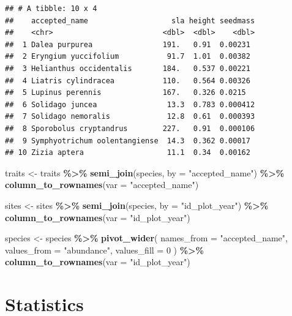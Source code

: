 \documentclass[
]{article}
\newenvironment{Shaded}{\begin{snugshade}}{\end{snugshade}}
\newcommand{\AttributeTok}[1]{\textcolor[rgb]{0.13,0.29,0.53}{#1}}
\newcommand{\DecValTok}[1]{\textcolor[rgb]{0.00,0.00,0.81}{#1}}
\newcommand{\FunctionTok}[1]{\textcolor[rgb]{0.13,0.29,0.53}{\textbf{#1}}}
\newcommand{\NormalTok}[1]{#1}
\newcommand{\OtherTok}[1]{\textcolor[rgb]{0.56,0.35,0.01}{#1}}
\newcommand{\SpecialCharTok}[1]{\textcolor[rgb]{0.81,0.36,0.00}{\textbf{#1}}}
\newcommand{\StringTok}[1]{\textcolor[rgb]{0.31,0.60,0.02}{#1}}
\begin{document}
\begin{verbatim}
## # A tibble: 10 x 4
##    accepted_name                   sla height seedmass
##    <chr>                         <dbl>  <dbl>    <dbl>
##  1 Dalea purpurea                191.   0.91  0.00231 
##  2 Eryngium yuccifolium           91.7  1.01  0.00382 
##  3 Helianthus occidentalis       184.   0.537 0.00221 
##  4 Liatris cylindracea           110.   0.564 0.00326 
##  5 Lupinus perennis              167.   0.326 0.0215  
##  6 Solidago juncea                13.3  0.783 0.000412
##  7 Solidago nemoralis             12.8  0.61  0.000393
##  8 Sporobolus cryptandrus        227.   0.91  0.000106
##  9 Symphyotrichum oolentangiense  14.3  0.362 0.00017 
## 10 Zizia aptera                   11.1  0.34  0.00162
\end{verbatim}

\begin{Shaded}
\begin{Highlighting}[]
\NormalTok{traits }\OtherTok{\textless{}{-}}\NormalTok{ traits }\SpecialCharTok{\%\textgreater{}\%}
  \FunctionTok{semi\_join}\NormalTok{(species, }\AttributeTok{by =} \StringTok{"accepted\_name"}\NormalTok{) }\SpecialCharTok{\%\textgreater{}\%}
  \FunctionTok{column\_to\_rownames}\NormalTok{(}\AttributeTok{var =} \StringTok{"accepted\_name"}\NormalTok{)}

\NormalTok{sites }\OtherTok{\textless{}{-}}\NormalTok{ sites }\SpecialCharTok{\%\textgreater{}\%}
  \FunctionTok{semi\_join}\NormalTok{(species, }\AttributeTok{by =} \StringTok{"id\_plot\_year"}\NormalTok{) }\SpecialCharTok{\%\textgreater{}\%}
  \FunctionTok{column\_to\_rownames}\NormalTok{(}\AttributeTok{var =} \StringTok{"id\_plot\_year"}\NormalTok{)}

\NormalTok{species }\OtherTok{\textless{}{-}}\NormalTok{ species }\SpecialCharTok{\%\textgreater{}\%}
  \FunctionTok{pivot\_wider}\NormalTok{(}
    \AttributeTok{names\_from =} \StringTok{"accepted\_name"}\NormalTok{, }\AttributeTok{values\_from =} \StringTok{"abundance"}\NormalTok{, }\AttributeTok{values\_fill =} \DecValTok{0}
\NormalTok{    ) }\SpecialCharTok{\%\textgreater{}\%}
  \FunctionTok{column\_to\_rownames}\NormalTok{(}\AttributeTok{var =} \StringTok{"id\_plot\_year"}\NormalTok{)}
\end{Highlighting}
\end{Shaded}

\section{Statistics}\label{statistics}
\end{document}

